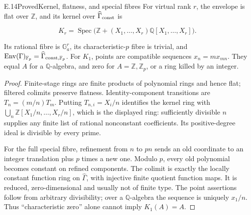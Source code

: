 \begin{statement}{E.14}{Proved}{Kernel, flatness, and special fibres}
For virtual rank $r$, the envelope is flat over $\mathbb Z$,
and its kernel over $\widehat\Gamma_{\rm const}$ is

$$
K_r=\operatorname{Spec}\bigl(\mathbb Z+
       (X_1,\ldots,X_r)\mathbb Q[X_1,\ldots,X_r]\bigr).
$$

Its rational fibre is $\mathbb G_a^r$, its characteristic-$p$
fibre is trivial, and
$\operatorname{Env}(\Gamma)_{\mathbb F_p}
=\widehat\Gamma_{{\rm const},\mathbb F_p}$.
For $K_1$, points are compatible sequences $x_n=mx_{mn}$.
They equal $A$ for a $\mathbb Q$-algebra, and zero for
$A=\mathbb Z,\mathbb Z_p$, or a ring killed by an integer.
\end{statement}
\begin{proof}
Finite-stage rings are finite products of polynomial
rings and hence flat; filtered colimits preserve flatness.
Identity-component transitions are $T_n=(m/n)T_m$.
Putting $T_{n,i}=X_i/n$ identifies the kernel ring with
$\bigcup_n\mathbb Z[X_1/n,\ldots,X_r/n]$,
which is the displayed ring: sufficiently divisible $n$
supplies any finite list of rational nonconstant coefficients.
Its positive-degree ideal is divisible by every prime.

For the full special fibre, refinement from $n$ to $pn$
sends an old coordinate to an integer translation plus
$p$ times a new one. Modulo $p$, every old polynomial
becomes constant on refined components. The colimit
is exactly the locally constant function ring on
$\widehat\Gamma$, with injective finite quotient function
maps. It is reduced, zero-dimensional and usually
not of finite type.
The point assertions follow from arbitrary divisibility;
over a $\mathbb Q$-algebra the sequence is uniquely $x_1/n$.
Thus ``characteristic zero'' alone cannot imply $K_1(A)=A$.
\end{proof}

